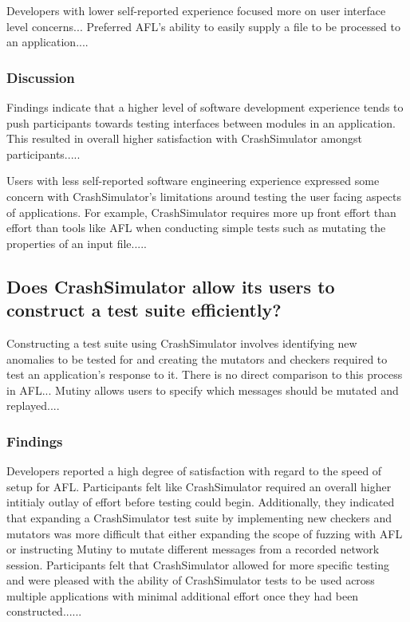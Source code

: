 Developers with lower self-reported experience
focused more on user interface level concerns...  Preferred AFL's ability
to easily supply a file to be processed to an application....


\subsubsection{Discussion}

Findings indicate that a higher level of software development experience
tends to push participants towards testing interfaces between modules in an
application.  This resulted in overall higher satisfaction with
CrashSimulator amongst participants.....

Users with less self-reported software engineering experience expressed
some concern with CrashSimulator's limitations around testing the user
facing aspects of applications.  For example, CrashSimulator requires more
up front effort than effort than tools like AFL when conducting simple
tests such as mutating the properties of an input file.....


\subsection{Does CrashSimulator allow its users to construct a test suite
efficiently?}

Constructing a test suite using CrashSimulator involves identifying new
anomalies to be tested for and creating the mutators and checkers required
to test an application's response to it.  There is no direct comparison to
this process in AFL...  Mutiny allows users to specify which messages
should be mutated and replayed....


\subsubsection{Findings}

Developers reported a high degree of satisfaction with regard to the speed
of setup for AFL.  Participants felt like CrashSimulator required an
overall higher intitialy outlay of effort before testing could begin.
Additionally, they indicated that expanding a CrashSimulator test suite by
implementing new checkers and mutators was more difficult that either
expanding the scope of fuzzing with AFL or instructing Mutiny to mutate
different messages from a recorded network session.  Participants felt that
CrashSimulator allowed for more specific testing and were pleased with the
ability of CrashSimulator tests to be used across multiple applications
with minimal additional effort once they had been constructed......


